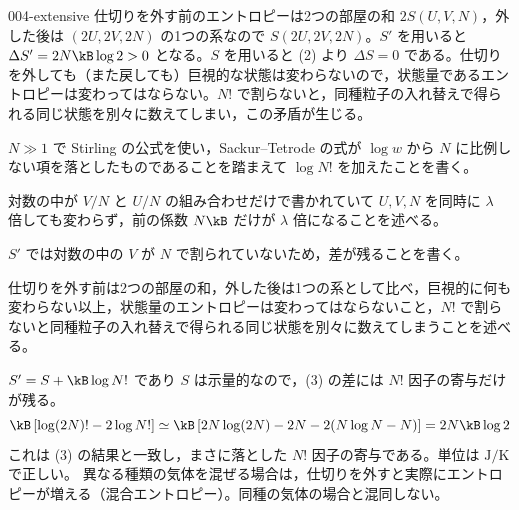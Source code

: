 \documentclass[uplatex,dvipdfmx,a4paper,11pt]{jsarticle}
\begin{document}
\begin{kaisetsu}{004-extensive}
 仕切りを外す前のエントロピーは2つの部屋の和 $2S(U,V,N)$，外した後は $(2U,2V,2N)$ の1つの系なので $S(2U,2V,2N)$。$S'$ を用いると $\Delta S'=2N\kB\log2>0$ となる。$S$ を用いると (2) より $\Delta S=0$ である。仕切りを外しても（また戻しても）巨視的な状態は変わらないので，状態量であるエントロピーは変わってはならない。$N!$ で割らないと，同種粒子の入れ替えで得られる同じ状態を別々に数えてしまい，この矛盾が生じる。
\begin{ronten}
  \item {} $N\gg1$ で Stirling の公式を使い，Sackur--Tetrode の式が $\log w$ から $N$ に比例しない項を落としたものであることを踏まえて $\log N!$ を加えたことを書く。
  \item {} 対数の中が $V/N$ と $U/N$ の組み合わせだけで書かれていて $U,V,N$ を同時に $\lambda$ 倍しても変わらず，前の係数 $N\kB$ だけが $\lambda$ 倍になることを述べる。
  \item {} $S'$ では対数の中の $V$ が $N$ で割られていないため，差が残ることを書く。
  \item {} 仕切りを外す前は2つの部屋の和，外した後は1つの系として比べ，巨視的に何も変わらない以上，状態量のエントロピーは変わってはならないこと，$N!$ で割らないと同種粒子の入れ替えで得られる同じ状態を別々に数えてしまうことを述べる。
\end{ronten}
\kenzan $S'=S+\kB\log N!$ であり $S$ は示量的なので，(3) の差には $N!$ 因子の寄与だけが残る。
\[\kB\left[\log(2N)!-2\log N!\right]\simeq\kB\left[2N\log(2N)-2N-2(N\log N-N)\right]=2N\kB\log2\]
これは (3) の結果と一致し，まさに落とした $N!$ 因子の寄与である。単位は $\unit{\joule\per\kelvin}$ で正しい。
\tsumazuki 異なる種類の気体を混ぜる場合は，仕切りを外すと実際にエントロピーが増える（混合エントロピー）。同種の気体の場合と混同しない。
\end{kaisetsu}
\end{document}
